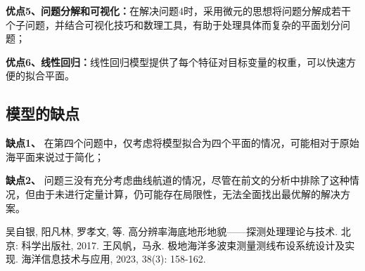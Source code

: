 \documentclass{cumcmthesis}
\begin{document}
\textbf{优点5、问题分解和可视化：}在解决问题4时，采用微元的思想将问题分解成若干个子问题，并结合可视化技巧和数理工具，有助于处理具体而复杂的平面划分问题；

\textbf{优点6、线性回归：}线性回归模型提供了每个特征对目标变量的权重，可以快速方便的拟合平面。

\subsection{模型的缺点}
\textbf{缺点1、} 在第四个问题中，仅考虑将模型拟合为四个平面的情况，可能相对于原始海平面来说过于简化；

\textbf{缺点2、} 问题三没有充分考虑曲线航道的情况，尽管在前文的分析中排除了这种情况，但由于未进行定量计算，仍可能存在局限性，无法全面找出最优解的解决方案。

\begin{thebibliography}{9}%
    吴自银, 阳凡林, 罗孝文, 等.
    \newblock 高分辨率海底地形地貌——探测处理理论与技术\allowbreak[M].
    \newblock 北京: 科学出版社, 2017.
    王风帆，马永.
    \newblock 极地海洋多波束测量测线布设系统设计及实现\allowbreak[J].
    \newblock 海洋信息技术与应用, 2023, 38(3): 158-162.
\end{thebibliography}
\end{document}
